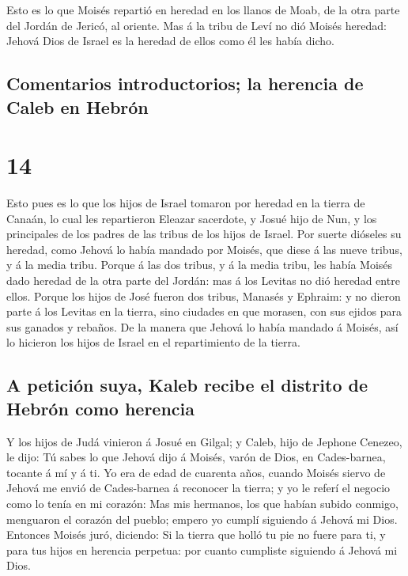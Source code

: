  Esto es lo que Moisés repartió en heredad en los llanos
de Moab, de la otra parte del Jordán de Jericó, al oriente.
 Mas á la tribu de Leví no dió Moisés heredad: Jehová
Dios de Israel es la heredad de ellos como él les había dicho.

\hypertarget{comentarios-introductorios-la-herencia-de-caleb-en-hebruxf3n}{%
\subsection{Comentarios introductorios; la herencia de Caleb en
Hebrón}\label{comentarios-introductorios-la-herencia-de-caleb-en-hebruxf3n}}

\hypertarget{section-13}{%
\section{14}\label{section-13}}

 Esto pues es lo que los hijos de Israel tomaron por
heredad en la tierra de Canaán, lo cual les repartieron Eleazar
sacerdote, y Josué hijo de Nun, y los principales de los padres de las
tribus de los hijos de Israel.  Por suerte dióseles su
heredad, como Jehová lo había mandado por Moisés, que diese á las nueve
tribus, y á la media tribu.  Porque á las dos tribus, y á
la media tribu, les había Moisés dado heredad de la otra parte del
Jordán: mas á los Levitas no dió heredad entre ellos. 
Porque los hijos de José fueron dos tribus, Manasés y Ephraim: y no
dieron parte á los Levitas en la tierra, sino ciudades en que morasen,
con sus ejidos para sus ganados y rebaños.  De la manera
que Jehová lo había mandado á Moisés, así lo hicieron los hijos de
Israel en el repartimiento de la tierra.

\hypertarget{a-peticiuxf3n-suya-kaleb-recibe-el-distrito-de-hebruxf3n-como-herencia}{%
\subsection{A petición suya, Kaleb recibe el distrito de Hebrón como
herencia}\label{a-peticiuxf3n-suya-kaleb-recibe-el-distrito-de-hebruxf3n-como-herencia}}

 Y los hijos de Judá vinieron á Josué en Gilgal; y Caleb,
hijo de Jephone Cenezeo, le dijo: Tú sabes lo que Jehová dijo á Moisés,
varón de Dios, en Cades-barnea, tocante á mí y á ti.  Yo
era de edad de cuarenta años, cuando Moisés siervo de Jehová me envió de
Cades-barnea á reconocer la tierra; y yo le referí el negocio como lo
tenía en mi corazón:  Mas mis hermanos, los que habían
subido conmigo, menguaron el corazón del pueblo; empero yo cumplí
siguiendo á Jehová mi Dios.  Entonces Moisés juró,
diciendo: Si la tierra que holló tu pie no fuere para ti, y para tus
hijos en herencia perpetua: por cuanto cumpliste siguiendo á Jehová mi
Dios.

